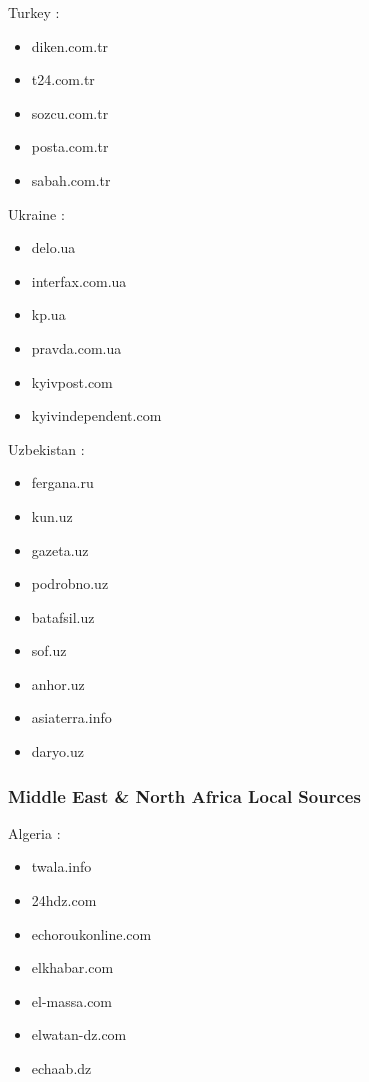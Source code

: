 \documentclass[
  letterpaper,
  DIV=11,
  numbers=noendperiod]{scrartcl}
\providecommand{\tightlist}{%
  \setlength{\itemsep}{0pt}\setlength{\parskip}{0pt}}\usepackage{longtable,booktabs,array}
\begin{document}
Turkey :

\begin{itemize}
\tightlist
\item
  diken.com.tr
\item
  t24.com.tr
\item
  sozcu.com.tr
\item
  posta.com.tr
\item
  sabah.com.tr
\end{itemize}

Ukraine :

\begin{itemize}
\tightlist
\item
  delo.ua
\item
  interfax.com.ua
\item
  kp.ua
\item
  pravda.com.ua
\item
  kyivpost.com
\item
  kyivindependent.com
\end{itemize}

Uzbekistan :

\begin{itemize}
\tightlist
\item
  fergana.ru
\item
  kun.uz
\item
  gazeta.uz
\item
  podrobno.uz
\item
  batafsil.uz
\item
  sof.uz
\item
  anhor.uz
\item
  asiaterra.info
\item
  daryo.uz
\end{itemize}

\subsubsection{Middle East \& North Africa Local
Sources}\label{middle-east-north-africa-local-sources}

Algeria :

\begin{itemize}
\tightlist
\item
  twala.info
\item
  24hdz.com
\item
  echoroukonline.com
\item
  elkhabar.com
\item
  el-massa.com
\item
  elwatan-dz.com
\item
  echaab.dz
\end{itemize}
\end{document}
